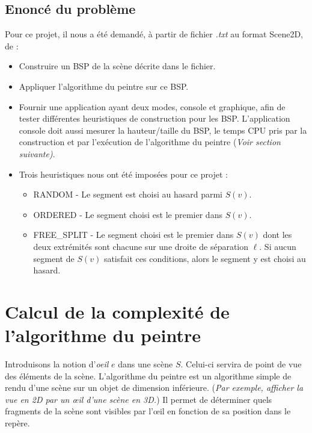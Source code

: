 \documentclass[11pts]{article}
\begin{document}
\subsection{Enoncé du problème}
Pour ce projet, il nous a été demandé, à partir de fichier \emph{.txt} au format Scene2D, de :
\begin{itemize}
\item Construire un BSP de la scène décrite dans le fichier.
\item Appliquer l'algorithme du peintre sur ce BSP.
\item Fournir une application ayant deux modes, console et graphique, afin de tester différentes heuristiques de construction pour les BSP. L'application console doit aussi mesurer la hauteur/taille du BSP, le temps CPU pris par la construction et par l'exécution de l'algorithme du peintre (\emph{Voir section suivante)}.
\item Trois heuristiques nous ont été imposées pour ce projet :
\begin{itemize}
\item RANDOM - Le segment est choisi au hasard parmi $S(v)$.
\item ORDERED - Le segment choisi est le premier dans $S(v)$.
\item FREE\_SPLIT - Le segment choisi est le premier dans $S(v)$ dont les deux extrémités sont chacune sur une droite de séparation $\ell$. Si aucun segment de $S(v)$ satisfait ces conditions, alors le segment y est choisi au hasard.
\end{itemize}
\end{itemize}

\newpage
\section{Calcul de la complexité de l'algorithme du peintre}
Introduisons la notion d'\emph{oeil} $e$ dans une scène $S$. Celui-ci servira de point de vue des éléments de la scène. L'algorithme du peintre est un algorithme simple de rendu d'une scène sur un objet de dimension inférieure. (\emph{Par exemple, afficher la vue en 2D par un œil d'une scène en 3D.}) Il permet de déterminer quels fragments de la scène sont visibles par l'œil en fonction de sa position dans le repère.
\end{document}
